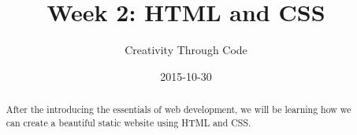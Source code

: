 \documentclass[11pt, letterpaper]{article}
\title{Week 2: HTML and CSS}
\date{2015-10-30}
\author{Creativity Through Code}
\begin{document}
	\maketitle
	\newpage
	\begin{abstract}
		After the introducing the essentials of web development, we will be learning how we can create a beautiful static website using HTML and CSS.
	\end{abstract}
	
\end{document}
